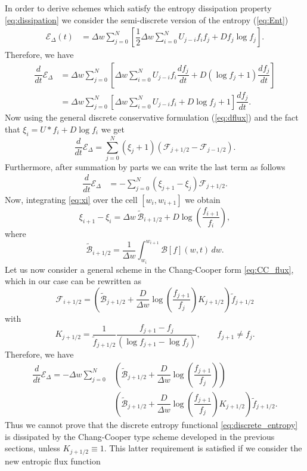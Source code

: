 \documentclass[a4paper]{article}
\theoremstyle{remark}\newtheorem{remark}{Remark}
\newcommand{\F}{\mathcal{F}}
\newcommand{\B}{\mathcal{B}}
\newcommand{\be}{\begin{equation}}
\newcommand{\ee}{\end{equation}}
\begin{document}
In order to derive schemes which satisfy the entropy dissipation property \eqref{eq:dissipation} we consider the semi-discrete version of the entropy (\ref{eq:Ent})
\be\begin{split}\label{eq:discrete_entropy}
\mathcal E_{\Delta}(t) &= \Delta w \sum_{j=0}^N \left[ \dfrac{1}{2}\Delta w\sum_{i=0}^N U_{j-i}f_if_j+D f_j\log f_j \right].
\end{split}
\ee
Therefore, we have
\[
\begin{split}
\dfrac{d}{dt}\mathcal{E}_{\Delta} &= \Delta w \sum_{j=0}^N \left[\Delta w \sum_{i=0}^N U_{j-i}f_i\dfrac{df_j}{dt} +D\left(\log f_j+1\right)\dfrac{df_j}{dt} \right]\\
&= \Delta w\sum_{j=0}^N \left[\Delta w \sum_{i=0}^NU_{j-i}f_i+D\log f_j+1\right]\dfrac{df_j}{dt}.
\end{split}
\]
Now using the general discrete conservative formulation (\ref{eq:dflux}) and the fact that $\xi_i = U*f_i+D\log f_i$ we get
\[
\dfrac{d}{dt}\mathcal{E}_{\Delta} = \sum_{j=0}^N (\xi_j+1)(\F_{j+1/2}-\F_{j-1/2}).
\]
Furthermore, after summation by parts we can write the last term as follows
\be\begin{split}\label{eq:back_E}
\dfrac{d}{dt}\mathcal{E}_{\Delta} &= -\sum_{j=0}^N(\xi_{j+1}-\xi_{j})\F_{j+1/2}.
\end{split}\ee
Now, integrating \eqref{eq:xi} over the cell $[w_i,w_{i+1}]$ we obtain
\be
\xi_{i+1}-\xi_i  = {\Delta w\,\tilde{ \B}_{i+1/2}} + D\log\left(\dfrac{f_{i+1}}{f_i}\right),
\label{eq:xj1xj}
\ee
where 
\[
\tilde{\B}_{i+1/2}=\frac1{\Delta w}\int_{w_i}^{w_{i+1}}\B[f](w,t)\,dw.
\]
Let us now consider a general scheme in the Chang-Cooper form \eqref{eq:CC_flux}, which in our case can be rewritten as
\be
\F_{i+1/2} = \left({\tilde{ \B}_{j+1/2}}+\frac{D}{\Delta w}\log\left(\dfrac{f_{j+1}}{f_j}\right)K_{j+1/2}\right)\tilde f_{j+1/2}
\ee
with 
\be
K_{j+1/2} = \frac1{\tilde f_{j+1/2}}\dfrac{f_{j+1}-f_j}{(\log f_{j+1}-\log f_j)},\qquad f_{j+1}\ne f_j.
\ee
Therefore, we have
\be
\label{eq:diss_entropy_general}
\begin{split}
\dfrac{d}{dt}\mathcal{E}_{\Delta} =-\Delta w \sum_{j=0}^N  &\left({\tilde{ \B}_{j+1/2}}+ \dfrac{D}{\Delta w}\log\left(\dfrac{f_{j+1}}{f_j}\right)\right)\\
& \left({\tilde{ \B}_{j+1/2}} + \dfrac{D}{\Delta w}\log\left(\dfrac{f_{j+1}}{f_j}\right)K_{j+1/2}\right)\tilde f_{j+1/2}.
\end{split}
\ee
Thus we cannot prove that the discrete entropy functional \eqref{eq:discrete_entropy} is dissipated by the Chang-Cooper type scheme developed in the previous sections, unless $K_{j+1/2}\equiv 1$. This latter requirement is satisfied if we consider the new entropic flux function
\end{document}
